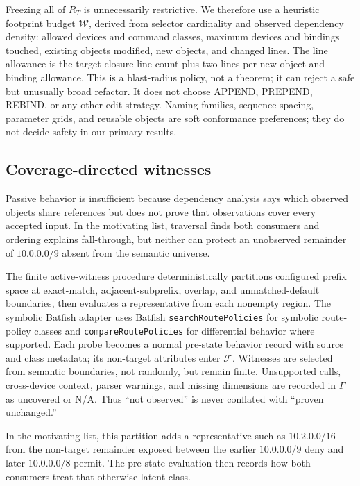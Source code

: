 \documentclass[conference]{IEEEtran}
\newcommand{\semframe}{\mathcal{F}}
\newcommand{\budget}{\mathcal{W}}
\newcommand{\na}{\textsc{N/A}\xspace}
\begin{document}
Freezing all of $R_T$ is unnecessarily restrictive.  We therefore use a
heuristic footprint budget $\budget$, derived from selector cardinality and
observed dependency density:
allowed devices and command classes, maximum devices and bindings touched,
existing objects modified, new objects, and changed lines.  The line allowance
is the target-closure line count plus two lines per new-object and binding
allowance.  This is a blast-radius policy, not a theorem;
it can reject a safe but unusually broad refactor.  It does not choose APPEND,
PREPEND, REBIND, or any other edit strategy.  Naming families, sequence spacing,
parameter grids, and reusable objects are soft conformance preferences; they do
not decide safety in our primary results.

\subsection{Coverage-directed witnesses}

Passive behavior is insufficient because dependency analysis says which observed
objects share references but does not
prove that observations cover every accepted input.  In the motivating list,
traversal finds both consumers and ordering explains fall-through, but neither
can protect an unobserved remainder of $10.0.0.0/9$ absent from the semantic
universe.

The finite active-witness procedure deterministically partitions configured prefix space
at exact-match, adjacent-subprefix, overlap, and unmatched-default boundaries,
then evaluates a representative from each nonempty region.  The symbolic Batfish adapter
uses Batfish \texttt{searchRoutePolicies} for symbolic route-policy classes and
\texttt{compareRoutePolicies} for differential behavior where supported.  Each
probe becomes a normal pre-state behavior record with source and class
metadata; its non-target attributes enter $\semframe$.  Witnesses are selected
from semantic boundaries, not randomly, but remain finite.  Unsupported calls,
cross-device context, parser warnings, and missing dimensions are recorded in
$\Gamma$ as uncovered or \na.  Thus ``not observed'' is never conflated with
``proven unchanged.''

In the motivating list, this partition adds a representative such as
$10.2.0.0/16$ from the non-target remainder exposed between the earlier
$10.0.0.0/9$ deny and later $10.0.0.0/8$ permit.  The pre-state evaluation then
records how both consumers treat that otherwise latent class.
\end{document}
